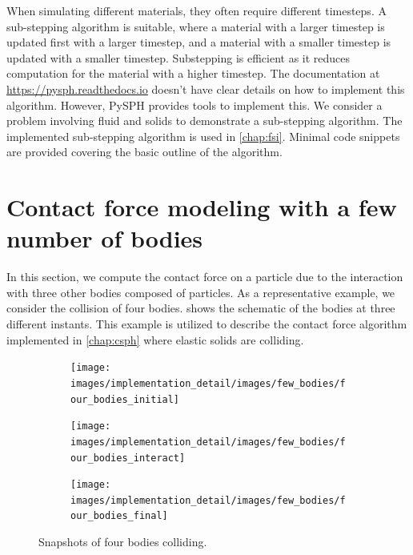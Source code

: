 When simulating different materials, they often require different timesteps. A
sub-stepping algorithm is suitable, where a material with a larger timestep is
updated first with a larger timestep, and a material with a smaller timestep is
updated with a smaller timestep. Substepping is efficient as it reduces
computation for the material with a higher timestep. The documentation at
\url{https://pysph.readthedocs.io} doesn't have clear details on how to
implement this algorithm. However, PySPH provides tools to implement this. We
consider a problem involving fluid and solids to demonstrate a sub-stepping
algorithm. The implemented sub-stepping algorithm is used in \cref{chap:fsi}.
Minimal code snippets are provided covering the basic outline of the algorithm.


\FloatBarrier%
\section{Contact force modeling with a few number of bodies}
\label{sec:tracking-few-bodies}
In this section, we compute the contact force on a particle due to the
interaction with three other bodies composed of particles. As a representative
example, we consider the collision of four bodies. 
shows the schematic of the bodies at three different instants. This example is
utilized to describe the contact force algorithm implemented in \cref{chap:csph}
where elastic solids are colliding.
\begin{figure}[!htpb]
  \centering
  \begin{subfigure}{0.32\textwidth}
    \centering
    \texttt{[image: images/implementation\_detail/images/few\_bodies/four\_bodies\_initial]}
  \end{subfigure}
  \begin{subfigure}{0.32\textwidth}
    \centering
    \texttt{[image: images/implementation\_detail/images/few\_bodies/four\_bodies\_interact]}
  \end{subfigure}
  \begin{subfigure}{0.32\textwidth}
    \centering
    \texttt{[image: images/implementation\_detail/images/few\_bodies/four\_bodies\_final]}
  \end{subfigure}
  \caption{Snapshots of four bodies colliding.}
\label{fig:id:four_bodies_contact}
\end{figure}


